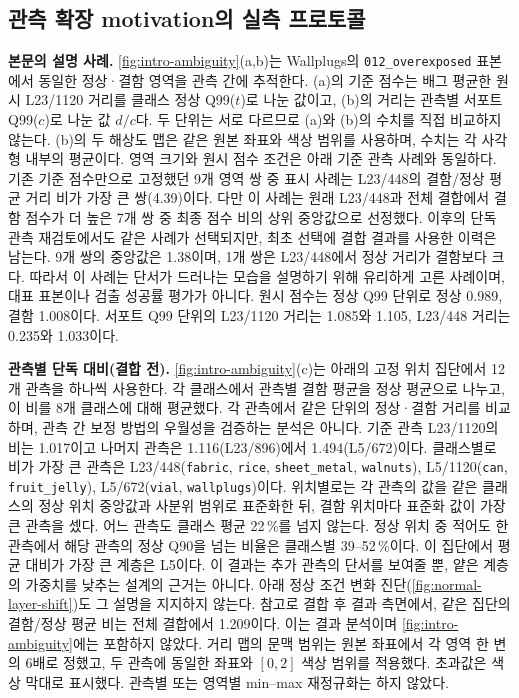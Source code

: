 \subsection{관측 확장 motivation의 실측 프로토콜}
\label{sec:appendix:motivation}

\noindent\textbf{본문의 설명 사례.}
\cref{fig:intro-ambiguity}(a,b)는 Wallplugs의 \texttt{012\_overexposed} 표본에서 동일한 정상·결함 영역을 관측 간에 추적한다.
(a)의 기준 점수는 배그 평균한 원시 L23/1120 거리를 클래스 정상 Q99($t$)로 나눈 값이고, (b)의 거리는 관측별 서포트 Q99($c$)로 나눈 값 $d/c$다. 두 단위는 서로 다르므로 (a)와 (b)의 수치를 직접 비교하지 않는다.
(b)의 두 해상도 맵은 같은 원본 좌표와 색상 범위를 사용하며, 수치는 각 사각형 내부의 평균이다.
영역 크기와 원시 점수 조건은 아래 기준 관측 사례와 동일하다.
기존 기준 점수만으로 고정했던 9개 영역 쌍 중 표시 사례는 L23/448의 결함/정상 평균 거리 비가 가장 큰 쌍(4.39)이다. 다만 이 사례는 원래 L23/448과 전체 결합에서 결함 점수가 더 높은 7개 쌍 중 최종 점수 비의 상위 중앙값으로 선정했다. 이후의 단독 관측 재검토에서도 같은 사례가 선택되지만, 최초 선택에 결합 결과를 사용한 이력은 남는다.
9개 쌍의 중앙값은 1.38이며, 1개 쌍은 L23/448에서 정상 거리가 결함보다 크다.
따라서 이 사례는 단서가 드러나는 모습을 설명하기 위해 유리하게 고른 사례이며, 대표 표본이나 검출 성공률 평가가 아니다.
원시 점수는 정상 Q99 단위로 정상 0.989, 결함 1.008이다.
서포트 Q99 단위의 L23/1120 거리는 1.085와 1.105, L23/448 거리는 0.235와 1.033이다.

\noindent\textbf{관측별 단독 대비(결합 전).}
\cref{fig:intro-ambiguity}(c)는 아래의 고정 위치 집단에서 12개 관측을 하나씩 사용한다. 각 클래스에서 관측별 결함 평균을 정상 평균으로 나누고, 이 비를 8개 클래스에 대해 평균했다. 각 관측에서 같은 단위의 정상·결함 거리를 비교하며, 관측 간 보정 방법의 우월성을 검증하는 분석은 아니다.
기준 관측 L23/1120의 비는 1.017이고 나머지 관측은 1.116(L23/896)에서 1.494(L5/672)이다.
클래스별로 비가 가장 큰 관측은 L23/448(\texttt{fabric}, \texttt{rice}, \texttt{sheet\_metal}, \texttt{walnuts}), L5/1120(\texttt{can}, \texttt{fruit\_jelly}), L5/672(\texttt{vial}, \texttt{wallplugs})이다.
위치별로는 각 관측의 값을 같은 클래스의 정상 위치 중앙값과 사분위 범위로 표준화한 뒤, 결함 위치마다 표준화 값이 가장 큰 관측을 셌다. 어느 관측도 클래스 평균 22\,\%를 넘지 않는다.
정상 위치 중 적어도 한 관측에서 해당 관측의 정상 Q90을 넘는 비율은 클래스별 39--52\,\%이다.
이 집단에서 평균 대비가 가장 큰 계층은 L5이다. 이 결과는 추가 관측의 단서를 보여줄 뿐, 얕은 계층의 가중치를 낮추는 설계의 근거는 아니다. 아래 정상 조건 변화 진단(\cref{fig:normal-layer-shift})도 그 설명을 지지하지 않는다.
참고로 결합 후 결과 측면에서, 같은 집단의 결함/정상 평균 비는  전체 결합에서 1.209이다. 이는 결과 분석이며 \cref{fig:intro-ambiguity}에는 포함하지 않았다.
거리 맵의 문맥 범위는 원본 좌표에서 각 영역 한 변의 6배로 정했고, 두 관측에 동일한 좌표와 $[0,2]$ 색상 범위를 적용했다. 초과값은 색상 막대로 표시했다.
관측별 또는 영역별 min--max 재정규화는 하지 않았다.

